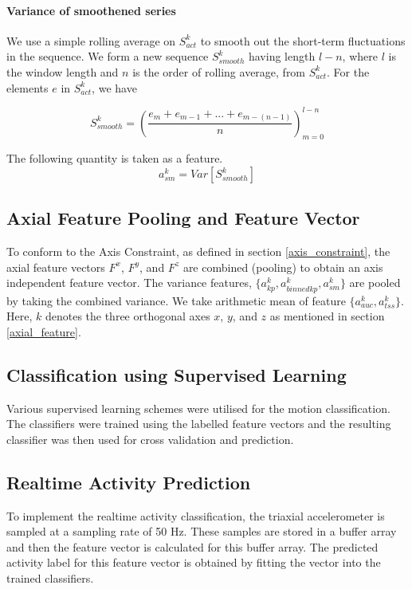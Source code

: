 \documentclass[5p]{elsarticle}
\begin{document}
\paragraph{Variance of smoothened series}
We use a simple rolling average on $S^k_{act}$ to smooth out the short-term fluctuations in the sequence. We form a new sequence $S^k_{smooth}$ having length $l-n$, where $l$ is the window length and $n$ is the order of rolling average, from $S^k_{act}$. For the elements $e$ in $S^k_{act}$, we have

\begin{equation} \label{eq:sk_smooth}
S^k_{smooth} = (\frac{e_{m}+e_{m-1}+...+e_{m-(n-1)}}{n})_{m=0}^{l-n}
\end{equation}

The following quantity is taken as a feature.
\begin{equation} \label{eq:sk_smooth}
a_{sm}^k = Var[S^k_{smooth}]
\end{equation}

\subsection{Axial Feature Pooling and Feature Vector}
To conform to the Axis Constraint, as defined in section \ref{axis_constraint}, the axial feature vectors $F^x$, $F^y$, and $F^z$ are combined (pooling) to obtain an axis independent feature vector. The variance features, $ \{a_{kp}^k, a_{binnedkp}^k, a_{sm}^k\} $ are pooled by taking the combined variance. We take arithmetic mean of feature $ \{a_{auc}^k, a_{tss}^k\} $. Here, $k$ denotes the three orthogonal axes $x$, $y$, and $z$ as mentioned in section \ref{axial_feature}.


\subsection{Classification using Supervised Learning}
Various supervised learning schemes were utilised for the motion classification. The classifiers were trained using the labelled feature vectors and the resulting classifier was then used for cross validation and prediction.

\subsection{Realtime Activity Prediction}
To implement the realtime activity classification, the triaxial accelerometer is sampled at a sampling rate of 50 Hz. These samples are stored in a buffer array and then the feature vector is  calculated for this buffer array. The predicted activity label for this feature vector is obtained by fitting the vector into the trained classifiers.
\end{document}
